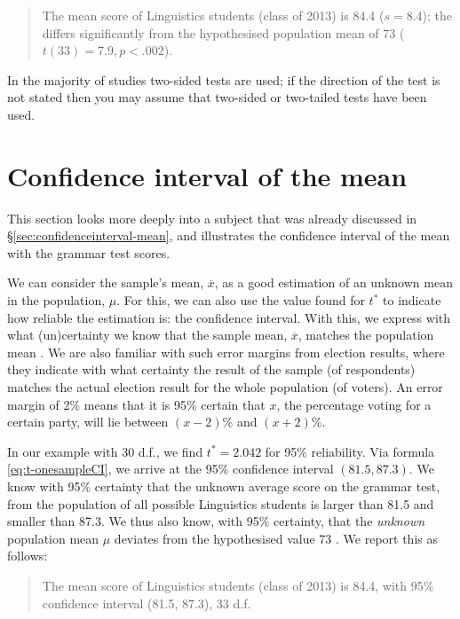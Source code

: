 \documentclass[
]{book}
\begin{document}
\begin{quote}
The mean score of Linguistics students (class of 2013) is
84.4 (\(s=8.4\)); the differs significantly from the hypothesised
population mean of 73 (\(t(33)=7.9, p<.002\)).
\end{quote}

In the majority of studies two-sided tests are used; if the direction
of the test is not stated then you may assume that two-sided or two-tailed tests
have been used.

\hypertarget{sec:t-confidenceinterval-mean}{%
\section{Confidence interval of the mean}\label{sec:t-confidenceinterval-mean}}

This section looks more deeply into a subject that was already discussed in
§\ref{sec:confidenceinterval-mean}, and illustrates the confidence interval
of the mean with the grammar test scores.

We can consider the sample's mean, \(\overline{x}\), as a good estimation
of an unknown mean in the population,
\(\mu\). For this, we can also use the value found for \(t^*\) to indicate how
reliable the estimation is: the confidence interval. With this, we express
with what (un)certainty we know that the sample mean, \(\overline{x}\), matches
the population mean \citep{Cumm12}. We are also familiar with such error margins
from election results, where they indicate with what certainty the result
of the sample (of respondents) matches the actual election result for the whole
population (of voters). An
error margin of 2\% means that it is 95\% certain that \(x\), the percentage voting
for a certain party, will lie between \((x-2)\)\% and \((x+2)\)\%.

In our example with 30 d.f., we find \(t^*=2.042\) for 95\%
reliability. Via formula
\eqref{eq:t-onesampleCI}, we arrive at the 95\%
confidence interval \((81.5, 87.3)\). We know with 95\% certainty
that the unknown average score on the grammar test, from the population
of all possible Linguistics students is larger than 81.5 and
smaller than 87.3. We thus also know, with 95\% certainty, that the
\emph{unknown} population mean \(\mu\) deviates from the hypothesised
value 73 \citep{Cumm12}. We report this as follows:

\begin{quote}
The mean score of Linguistics students (class of 2013) is
84.4, with 95\% confidence interval (81.5, 87.3), 33 d.f.
\end{quote}
\end{document}
